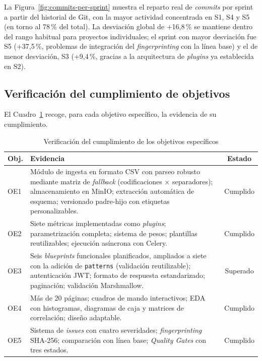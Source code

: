 La Figura~\ref{fig:commits-per-sprint} muestra el reparto real de
\emph{commits} por sprint a partir del historial de Git, con la mayor
actividad concentrada en S1, S4 y S5 (en torno al 78\,\% del total).
La desviación global de +16,8\,\% se mantiene dentro del rango habitual
para proyectos individuales; el sprint con mayor desviación fue S5
(+37,5\,\%, problemas de integración del \emph{fingerprinting} con la
línea base) y el de menor desviación, S3 (+9,4\,\%, gracias a la
arquitectura de \emph{plugins} ya establecida en S2).

\subsection{Verificación del cumplimiento de objetivos}

El Cuadro~\ref{tab:cumplimiento} recoge, para cada objetivo específico, la
evidencia de su cumplimiento.

\begin{table}[htbp]
  \centering
  \caption{Verificación del cumplimiento de los objetivos específicos}
  \label{tab:cumplimiento}
  \begin{tabularx}{\textwidth}{l X c}
    \toprule
    \textbf{Obj.} & \textbf{Evidencia} & \textbf{Estado} \\
    \midrule
    OE1 & Módulo de ingesta en formato \ac{CSV} con parseo robusto mediante
      matriz de \emph{fallback} (codificaciones $\times$ separadores);
      almacenamiento en MinIO; extracción automática de esquema;
      versionado padre-hijo con etiquetas personalizables. & Cumplido \\
    OE2 & Siete métricas implementadas como \emph{plugins}; parametrización
      completa; sistema de pesos; plantillas reutilizables; ejecución
      asíncrona con Celery. & Cumplido \\
    OE3 & Seis \emph{blueprints} funcionales planificados, ampliados a
      siete con la adición de \texttt{patterns} (validación
      reutilizable); autenticación \ac{JWT}; formato de respuesta
      estandarizado; paginación; validación Marshmallow. & Superado \\
    OE4 & Más de 20 páginas; cuadros de mando interactivos; \ac{EDA} con
      histogramas, diagramas de caja y matrices de correlación; diseño
      adaptable. & Cumplido \\
    OE5 & Sistema de \emph{issues} con cuatro severidades;
      \emph{fingerprinting} \ac{SHA}-256; comparación con línea base;
      \emph{Quality Gates} con tres estados. & Cumplido \\
    \bottomrule
  \end{tabularx}
\end{table}


